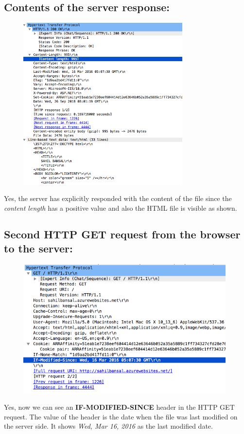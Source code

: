 \documentclass[]{report}
\begin{document}
\subsection{Contents of the server response:}
\begin{figure}[H]
	\vspace{0pt}
	\includegraphics[height = 250pt, keepaspectratio]{Snapshots/q2/2_2.png}
\end{figure}
Yes, the server has explicitly responded with the content of the file since the \textit{content length} has a positive value and also the HTML file is visible as shown.
\subsection{Second HTTP GET request from the browser to the server: }
\begin{figure}[H]
	\vspace{0pt}
	\includegraphics[height = 200pt, keepaspectratio]{Snapshots/q2/2_3.png}
\end{figure}
Yes, now we can see an \textbf{IF-MODIFIED-SINCE} header in the HTTP GET request. The value of the header is the date when the file was last modified on the server side. It shows \textit{Wed, Mar 16, 2016} as the last modified date.
\end{document}
